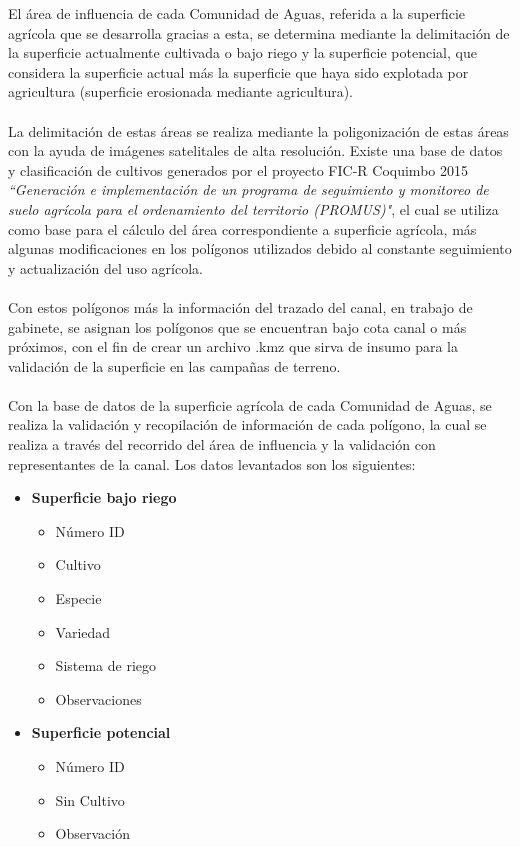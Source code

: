 \documentclass[]{article}
\begin{document}
El área de influencia de cada Comunidad de Aguas, referida a la superficie agrícola que se desarrolla gracias a esta, se determina mediante la delimitación de la superficie actualmente cultivada o bajo riego y la superficie potencial, que considera la superficie actual más la superficie que haya sido explotada por agricultura (superficie erosionada mediante agricultura). \\
\\
La delimitación de estas áreas se realiza mediante la poligonización de estas áreas con la ayuda de imágenes satelitales de alta resolución. Existe una base de  datos y clasificación de cultivos generados por el proyecto FIC-R Coquimbo 2015 \textit{``Generación e implementación de un programa de seguimiento y monitoreo de suelo agrícola para el ordenamiento del territorio (PROMUS)"}, el cual se utiliza como base para el cálculo del área correspondiente a superficie agrícola, más algunas modificaciones en los polígonos utilizados debido al constante seguimiento y actualización del uso agrícola. \\
\\
Con estos polígonos más la información del trazado del canal, en trabajo de gabinete, se asignan los polígonos que se encuentran bajo cota canal o más próximos, con el fin de crear un archivo .kmz que sirva de insumo para la validación de la superficie en las campañas de terreno. \\
\\
Con la base de datos de la superficie agrícola de cada Comunidad de Aguas, se realiza la validación y recopilación de información de cada polígono, la cual se realiza a través del recorrido del área de influencia y la validación con representantes de la canal. Los datos levantados son los siguientes:

\begin{itemize}
	\item \textbf{Superficie bajo riego}
	\begin{itemize}	
		\item Número ID
		\item Cultivo
		\item Especie
		\item Variedad
		\item Sistema de riego
		\item Observaciones
	\end{itemize}
	\item \textbf{Superficie potencial}
	\begin{itemize}	
		\item Número ID
		\item Sin Cultivo
		\item Observación
	\end{itemize}
\end{itemize}
\end{document}
